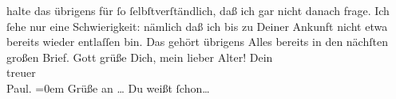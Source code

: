                halte das übrigens für ſo ſelbſtverſtändlich, daß ich gar nicht danach frage. Ich
               ſehe nur eine Schwierigkeit: nämlich daß ich bis zu Deiner Ankunft nicht etwa bereits
               wieder entlaſſen bin.\pend
           \pstart
           Das gehört übrigens Alles bereits in den nächſten großen Brief. Gott grüße Dich, mein
               lieber Alter!\pend
           \pstart
           Dein {\\[\baselineskip]}treuer {\\[\baselineskip]}\spacefill\mbox{Paul.}\pend
           \leftskip=0em{}\pstart
           \noindent{}Grüße an {\dots}{ }
                  Du weißt
                     ſchon{\dots}\pend
           \endnumbering{}  
      